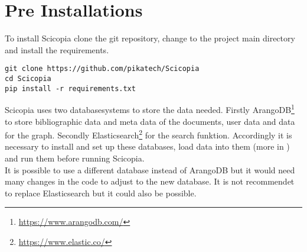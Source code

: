 \section{Pre Installations}
To install Scicopia clone the git repository, change to the project main directory and install the requirements. 
\begin{verbatim}
git clone https://github.com/pikatech/Scicopia
cd Scicopia
pip install -r requirements.txt
\end{verbatim}
Scicopia uses two databasesystems to store the data needed. Firstly ArangoDB\footnote{\url{https://www.arangodb.com/}} to store bibliographic data and meta data of the documents, user data and data for the graph. Secondly Elasticsearch\footnote{\url{https://www.elastic.co/}} for the search funktion. Accordingly it is necessary to install and set up these databases, load data into them (more in ) and run them before running Scicopia.\\
It is possible to use a different database instead of ArangoDB but it would need many changes in the code to adjust to the new database. It is not recommendet to replace Elasticsearch but it could also be possible.
